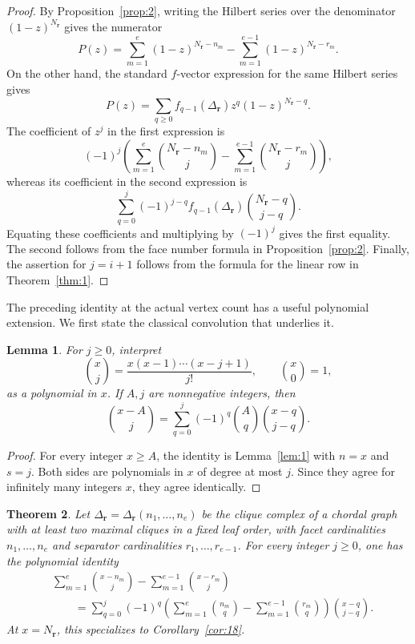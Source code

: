 \documentclass[11pt]{amsart}
\newtheorem{theorem}{Theorem}[section]
\newtheorem{lemma}[theorem]{Lemma}
\theoremstyle{definition}
\theoremstyle{remark}
\begin{document}
	\begin{proof}
		By Proposition~\ref{prop:2}, writing the Hilbert series over the denominator $(1-z)^{N_{\mathbf r}}$ gives the numerator
		\[
		P(z)=
		\sum_{m=1}^{e}(1-z)^{N_{\mathbf r}-n_m}
		-\sum_{m=1}^{e-1}(1-z)^{N_{\mathbf r}-r_m}.
		\]
		On the other hand, the standard $f$-vector expression for the same Hilbert series gives
		\[
		P(z)=
		\sum_{q\geq0}
		f_{q-1}(\Delta_{\mathbf r})z^q
		(1-z)^{N_{\mathbf r}-q}.
		\]
		The coefficient of $z^j$ in the first expression is
		\[
		(-1)^j
		\left(
		\sum_{m=1}^{e}\binom{N_{\mathbf r}-n_m}{j}
		-\sum_{m=1}^{e-1}\binom{N_{\mathbf r}-r_m}{j}
		\right),
		\]
		whereas its coefficient in the second expression is
		\[
		\sum_{q=0}^{j}
		(-1)^{j-q}f_{q-1}(\Delta_{\mathbf r})
		\binom{N_{\mathbf r}-q}{j-q}.
		\]
		Equating these coefficients and multiplying by $(-1)^j$ gives the first equality. The second follows from the face number formula in Proposition~\ref{prop:2}. Finally, the assertion for $j=i+1$ follows from the formula for the linear row in Theorem~\ref{thm:1}.
	\end{proof}
	
	The preceding identity at the actual vertex count has a useful polynomial extension. We first state the classical convolution that underlies it.
	
	\begin{lemma}\label{lem:3}
		For $j\ge0$, interpret
		\[
		\binom{x}{j}=\frac{x(x-1)\cdots(x-j+1)}{j!},
		\qquad \binom{x}{0}=1,
		\]
		as a polynomial in $x$. If $A,j$ are nonnegative integers, then
		\[
		\binom{x-A}{j}
		=
		\sum_{q=0}^{j}(-1)^q\binom{A}{q}\binom{x-q}{j-q}.
		\]
	\end{lemma}
	
	\begin{proof}
		For every integer $x\ge A$, the identity is Lemma~\ref{lem:1} with $n=x$ and $s=j$. Both sides are polynomials in $x$ of degree at most $j$. Since they agree for infinitely many integers $x$, they agree identically.
	\end{proof}
	
	\begin{theorem}\label{thm:8}
		Let $\Delta_{\mathbf r}=\Delta_{\mathbf r}(n_1,\ldots,n_e)$ be the clique complex of a chordal graph with at least two maximal cliques in a fixed leaf order, with facet cardinalities $n_1,\ldots,n_e$ and separator cardinalities $r_1,\ldots,r_{e-1}$.
		For every integer $j\geq0$, one has the polynomial identity
		\begin{align*}
			&\sum_{m=1}^{e}\binom{x-n_m}{j}
			-\sum_{m=1}^{e-1}\binom{x-r_m}{j} \\
			&\qquad=
			\sum_{q=0}^{j}(-1)^q
			\left(
			\sum_{m=1}^{e}\binom{n_m}{q}
			-\sum_{m=1}^{e-1}\binom{r_m}{q}
			\right)
			\binom{x-q}{j-q}.
		\end{align*}
		At $x=N_{\mathbf r}$, this specializes to Corollary~\ref{cor:18}.
	\end{theorem}
	
\end{document}
